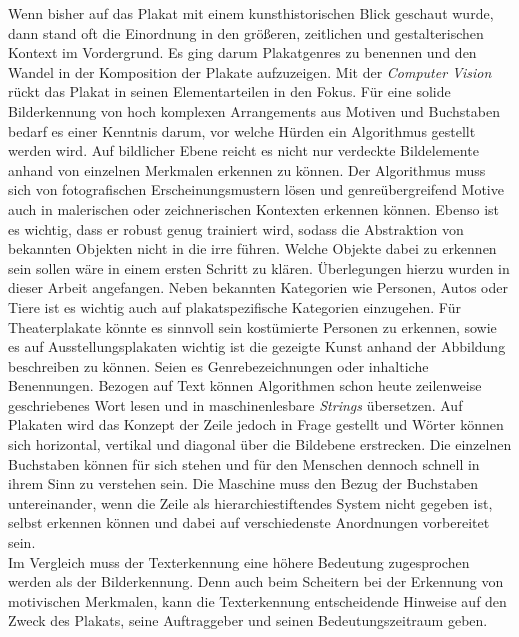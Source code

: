 \documentclass[a4paper,12pt,ngerman]{article}
\begin{document}
Wenn bisher auf das Plakat mit einem kunsthistorischen Blick geschaut wurde, dann stand oft die Einordnung in den größeren, zeitlichen und gestalterischen Kontext im Vordergrund. Es ging darum Plakatgenres zu benennen und den Wandel in der Komposition der Plakate aufzuzeigen. Mit der \textit{Computer Vision} rückt das Plakat in seinen Elementarteilen in den Fokus. Für eine solide Bilderkennung von hoch komplexen Arrangements aus Motiven und Buchstaben bedarf es einer Kenntnis darum, vor welche Hürden ein Algorithmus gestellt werden wird. Auf bildlicher Ebene reicht es nicht nur verdeckte Bildelemente anhand von einzelnen Merkmalen erkennen zu können. Der Algorithmus muss sich von fotografischen Erscheinungsmustern lösen und genreübergreifend Motive auch in malerischen oder zeichnerischen Kontexten erkennen können. Ebenso ist es wichtig, dass er robust genug trainiert wird, sodass die Abstraktion von bekannten Objekten nicht in die irre führen. Welche Objekte dabei zu erkennen sein sollen wäre in einem ersten Schritt zu klären. Überlegungen hierzu wurden in dieser Arbeit angefangen. Neben bekannten Kategorien wie Personen, Autos oder Tiere ist es wichtig auch auf plakatspezifische Kategorien einzugehen. Für Theaterplakate könnte es sinnvoll sein kostümierte Personen zu erkennen, sowie es auf Ausstellungsplakaten wichtig ist die gezeigte Kunst anhand der Abbildung beschreiben zu können. Seien es Genrebezeichnungen oder inhaltiche Benennungen. Bezogen auf Text können Algorithmen schon heute zeilenweise geschriebenes Wort lesen und in maschinenlesbare \textit{Strings} übersetzen. Auf Plakaten wird das Konzept der Zeile jedoch in Frage gestellt und Wörter können sich horizontal, vertikal und diagonal über die Bildebene erstrecken. Die einzelnen Buchstaben können für sich stehen und für den Menschen dennoch schnell in ihrem Sinn zu verstehen sein. Die Maschine muss den Bezug der Buchstaben untereinander, wenn die Zeile als hierarchiestiftendes System nicht gegeben ist, selbst erkennen können und dabei auf verschiedenste Anordnungen vorbereitet sein. \\
Im Vergleich muss der Texterkennung eine höhere Bedeutung zugesprochen werden als der Bilderkennung. Denn auch beim Scheitern bei der Erkennung von motivischen Merkmalen, kann die Texterkennung entscheidende Hinweise auf den Zweck des Plakats, seine Auftraggeber und seinen Bedeutungszeitraum geben. \\
\end{document}

